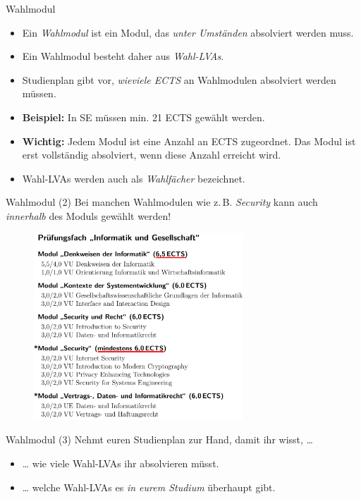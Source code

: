 \documentclass{beamer}
\begin{document}
\begin{frame}{Wahlmodul}
    \begin{itemize}
        \item Ein \textit{Wahlmodul} ist ein Modul, das
              \textit{unter Umständen} absolviert werden muss.
        \item Ein Wahlmodul besteht daher aus \textit{Wahl-LVAs}.
        \item Studienplan gibt vor, \textit{wieviele ECTS} an Wahlmodulen
              absolviert werden müssen.
        \item \textbf{Beispiel:} In SE müssen min. 21 ECTS gewählt werden.
        \item \textbf{Wichtig:} Jedem Modul ist eine Anzahl an ECTS
              zugeordnet. Das Modul ist erst vollständig absolviert, wenn
              diese Anzahl erreicht wird.
        \item Wahl-LVAs werden auch als \textit{Wahlfächer} bezeichnet.
    \end{itemize}
\end{frame}

\begin{frame}{Wahlmodul (2)}
    Bei manchen Wahlmodulen wie z.\,B. \textit{Security} kann auch
    \textit{innerhalb} des Moduls gewählt werden!
    \begin{figure}[htp]
        \includegraphics[width=0.7\textwidth]{pruefungsfach2.png}
    \end{figure}
\end{frame}

\begin{frame}{Wahlmodul (3)}
    Nehmt euren Studienplan zur Hand, damit ihr wisst, \ldots
    \begin{itemize}
        \item \ldots{} wie viele Wahl-LVAs ihr absolvieren müsst.
        \item \ldots{} welche Wahl-LVAs es \textit{in eurem Studium} überhaupt
            gibt.
    \end{itemize}
\end{frame}
\end{document}
